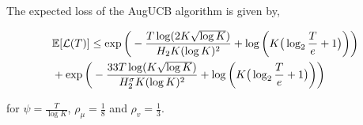 \begin{theorem}
\label{Result:Theorem:1}

The expected loss of the AugUCB algorithm is given by,
\begin{small}
\begin{align*}
&\mathbb{E}[\mathcal{L}(T)] \leq \exp\bigg( -\frac{T\log (2 K\sqrt{\log K})}{H_2 K (\log K)^2} + \log\bigg(K\big(\log_2\frac{T}{e}+1\big)\bigg)\bigg)\\
& + \exp\bigg(- \frac{33T\log ( K\sqrt{\log K})}{H_{2}^{\sigma} K(\log K)^2}  + \log\bigg(K\big(\log_2\frac{T}{e}+1\big)\bigg)\bigg) 
\end{align*}
\end{small}

for $\psi=\frac{T}{\log K}$, $\rho_{\mu}=\frac{1}{8}$ and $\rho_v=\frac{1}{3}$.


\end{theorem}


